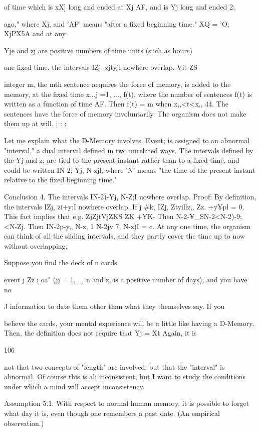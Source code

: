 \documentclass[10pt,twoside]{memoir}
\begin{document}
\begin{enumerate}
{{{{{{{{{{{{{{{{{{{of time which is xX] long and ended at Xj AF, and is Yj long and ended 2; 


ago," where Xj, 
and 'AF' means "after a fixed beginning time." XQ = 'O; XjPX5A and at any 


Yje and zj are positive numbers of time units (such as hours) 


one fixed time, the intervals IZj. zjtyjl nowhere overlap. Vit ZS%


integer m, the mth sentence acquires the force of memory, is added to the 
memory, at the fixed time x,,.j =1, ..., f(t), where the number of sentences 
f(t) is written as a function of time AF. Then f(t) = m when x,,<t<x,, 44. 
The sentences have the force of memory involuntarily. The organism does 
not make them up at will. ; : : 

Let me explain what the D-Memory involves. Event; is assigned to an 
abnormal "interval," a dual interval defined in two unrelated ways. The 
intervals defined by the Yj and z; are tied to the present instant rather than to 
a fixed time, and could be written IN-2;-Yj, N-zjl, where 'N' means "the time 
of the present instant relative to the fixed beginning time." 

Conclusion 4. The intervals IN-2)-Yj, N-Z;I nowhere overlap. Proof: By 
definition, the intervals IZj, zi+y;I nowhere overlap. If j #k, IZj, Ztyillz,, 
Zz. +y¥pl = 0. This fact implies that e.g. ZjZjtVjZKS ZK +YK- Then 
N-2-¥_SN-2<N-2)-9; <N-Zj. Then IN-2p-y,, N-z, 1 N-2jy 7, N-z)I = ¢. At 
any one time, the organism can think of all the sliding intervals, and they 
partly cover the time up to now without overlapping. 

Suppose you find the deck of n cards 


event j 
Zz i oa" 
(jj = 1, .., n and z, is a positive number of days), and you have no 


J 
information to date them other than what they themselves say. If you 


believe the cards, your mental experience will be a little like having a 
D-Memory. Then, the definition does not require that Yj = Xt Again, it is 


106 


not that two concepts of "length" are involved, but that the "interval" is 
abnormal. Of course this is ali inconsistent, but I want to study the 
conditions under which a mind will accept inconsistency. 

Assumption 5.1. With respect to normal human memory, it is possible 
to forget what day it is, even though one remembers a past date. (An 
empirical observation.) 

}}}}}}}}}}}}}}}}}}}
\end{enumerate}
\end{document}
